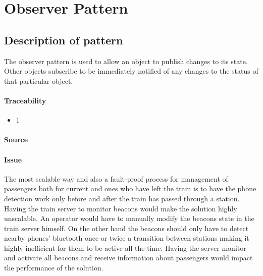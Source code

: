 
\section{Observer Pattern}

\subsection{Description of pattern}

	The observer pattern is used to allow an object to publish changes to its state. Other objects subscribe to be immediately notified of any changes to the status of that particular object. 

	
\iffalse
	USAGE : The main server will observe the state of train and Activate the beacons when train leaves a station . We don't need to have the beacons active when at a station 
beacons observe when phones are in range for establishing connections
\fi

\paragraph{Traceability} 
	\begin{itemize}
		\item 1
	\end{itemize}

\paragraph{Source} \cite{book:design-patterns}

\paragraph{Issue} \label{observerP:issue}
	The most scalable way and also a fault-proof process for management of passengers both for current and ones who have left the train is to have the phone detection work only before and after the train has passed through a station. Having the train server to monitor beacons would make the solution highly unscalable. An operator would have to manually modify the beacons state in the train server himself. On the other hand the beacons should only have to detect nearby phones' bluetooth once or twice a transition between stations making it highly inefficient for them to be active all the time. Having the server monitor and activate all beacons and receive information about passengers would impact the performance of the solution. 

